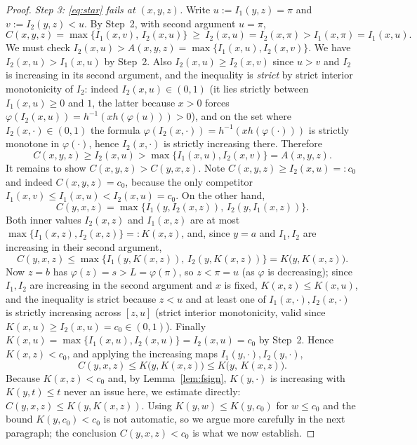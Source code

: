 \documentclass{amsart}
\theoremstyle{plain}
\theoremstyle{definition}
\begin{document}
\begin{proof}
\emph{Step 3: \eqref{eq:star} fails at $(x,y,z)$.}  Write $u:=I_1(y,z)=\pi$ and
$v:=I_2(y,z)<u$.  By Step~2, with second argument $u=\pi$,
\[
C(x,y,z)=\max\{I_1(x,v),\,I_2(x,u)\}\ \ge\ I_2(x,u)=I_2(x,\pi)>I_1(x,\pi)=I_1(x,u).
\]
We must check $I_2(x,u)>A(x,y,z)=\max\{I_1(x,u),I_2(x,v)\}$.  We have $I_2(x,u)>I_1(x,u)$ by
Step~2.  Also $I_2(x,u)\ge I_2(x,v)$ since $u>v$ and $I_2$ is increasing in its second
argument, and the inequality is \emph{strict} by strict interior monotonicity of $I_2$:
indeed $I_2(x,u)\in(0,1)$ (it lies strictly between $I_1(x,u)\ge 0$ and $1$, the latter
because $x>0$ forces $\varphi(I_2(x,u))=h^{-1}(x h(\varphi(u)))>0$), and on the set where
$I_2(x,\cdot)\in(0,1)$ the formula $\varphi(I_2(x,\cdot))=h^{-1}(x h(\varphi(\cdot)))$ is
strictly monotone in $\varphi(\cdot)$, hence $I_2(x,\cdot)$ is strictly increasing there.
Therefore
\[
C(x,y,z)\ge I_2(x,u)>\max\{I_1(x,u),I_2(x,v)\}=A(x,y,z).
\]
It remains to show $C(x,y,z)>C(y,x,z)$.  Note $C(x,y,z)\ge I_2(x,u)=:c_0$ and indeed
$C(x,y,z)=c_0$, because the only competitor $I_1(x,v)\le I_1(x,u)<I_2(x,u)=c_0$.  On the
other hand,
\[
C(y,x,z)=\max\{I_1(y,I_2(x,z)),\,I_2(y,I_1(x,z))\}.
\]
Both inner values $I_2(x,z)$ and $I_1(x,z)$ are at most $\max\{I_1(x,z),I_2(x,z)\}=:
K(x,z)$, and, since $y=a$ and $I_1,I_2$ are increasing in their second argument,
\[
C(y,x,z)\le\max\{I_1(y,K(x,z)),\,I_2(y,K(x,z))\}=K\bigl(y,K(x,z)\bigr).
\]
Now $z=b$ has $\varphi(z)=s>L=\varphi(\pi)$, so $z<\pi=u$ (as $\varphi$ is decreasing); since
$I_1,I_2$ are increasing in the second argument and $x$ is fixed,
$K(x,z)\le K(x,u)$, and the inequality is strict because $z<u$ and at least one of
$I_1(x,\cdot),I_2(x,\cdot)$ is strictly increasing across $[z,u]$ (strict interior
monotonicity, valid since $K(x,u)\ge I_2(x,u)=c_0\in(0,1)$).  Finally $K(x,u)=
\max\{I_1(x,u),I_2(x,u)\}=I_2(x,u)=c_0$ by Step~2.  Hence $K(x,z)<c_0$, and applying the
increasing maps $I_1(y,\cdot),I_2(y,\cdot)$,
\[
C(y,x,z)\le K\bigl(y,K(x,z)\bigr)\le K\bigl(y,\,K(x,z)\bigr).
\]
Because $K(x,z)<c_0$ and, by Lemma~\ref{lem:fsign}, $K(y,\cdot)$ is increasing with
$K(y,t)\le t$ never an issue here, we estimate directly:
$C(y,x,z)\le K(y,K(x,z))$. Using $K(y,w)\le K(y,c_0)$ for $w\le c_0$ and the bound
$K(y,c_0)<c_0$ is not automatic, so we argue more carefully in the next paragraph; the
conclusion $C(y,x,z)<c_0$ is what we now establish.


\end{proof}
\end{document}
